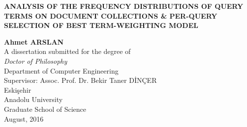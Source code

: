 \makeatother
{}
\thispagestyle{empty}
\setcounter{tocdepth}{3}
\begin{spacing}{1.0}
\vspace*{1cm}
\begin{center}{\textbf{ANALYSIS OF THE FREQUENCY DISTRIBUTIONS OF QUERY TERMS ON DOCUMENT COLLECTIONS \& PER-QUERY SELECTION OF BEST TERM-WEIGHTING MODEL}}\end{center}
\vspace*{4cm}
\begin{center}{\textbf{Ahmet ARSLAN}}
\vspace*{6cm}
\\{A dissertation submitted for the degree of}
\\{\emph{Doctor of Philosophy}}\vspace{0.6cm}
\\{Department of Computer Engineering}
\\{Supervisor: Assoc. Prof. Dr. Bekir Taner D\.{I}N\c{C}ER}
\vspace*{3cm}
\\{Eski\c{s}ehir}
\\{Anadolu University}
\\{Graduate School of Science}
\\{August, 2016} \end{center}
\end{spacing} 